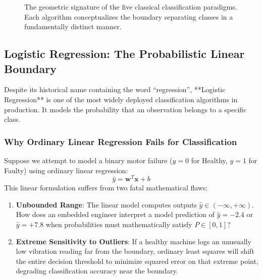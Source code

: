 \begin{figure}[htbp]
\caption{The geometric signature of the five classical classification paradigms. Each algorithm conceptualizes the boundary separating classes in a fundamentally distinct manner.}\label{fig:five_classifiers_geom}
\end{figure}

\subsection{Logistic Regression: The Probabilistic Linear Boundary}\label{subsec:logistic_regression}

Despite its historical name containing the word ``regression'', **Logistic Regression** is one of the most widely deployed classification algorithms in production. It models the probability that an observation belongs to a specific class.

\subsubsection{Why Ordinary Linear Regression Fails for Classification}
Suppose we attempt to model a binary motor failure ($y = 0$ for Healthy, $y = 1$ for Faulty) using ordinary linear regression:
\begin{equation}
\hat{y} = \mathbf{w}^T \mathbf{x} + b
\end{equation}
This linear formulation suffers from two fatal mathematical flaws:
\begin{enumerate}
    \item \textbf{Unbounded Range}: The linear model computes outputs $\hat{y} \in (-\infty, +\infty)$. How does an embedded engineer interpret a model prediction of $\hat{y} = -2.4$ or $\hat{y} = +7.8$ when probabilities must mathematically satisfy $P \in [0, 1]$?
    \item \textbf{Extreme Sensitivity to Outliers}: If a healthy machine logs an unusually low vibration reading far from the boundary, ordinary least squares will shift the entire decision threshold to minimize squared error on that extreme point, degrading classification accuracy near the boundary.
\end{enumerate}

